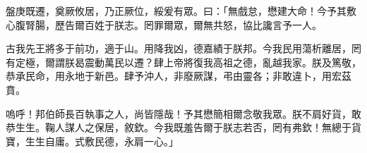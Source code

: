 
\begin{pinyinscope}
盤庚既遷，奠厥攸居，乃正厥位，綏爰有眾。曰：「無戲怠，懋建大命！今予其敷心腹腎腸，歷告爾百姓于朕志。罔罪爾眾，爾無共怒，協比讒言予一人。

古我先王將多于前功，適于山。用降我凶，德嘉績于朕邦。今我民用蕩析離居，罔有定極，爾謂朕曷震動萬民以遷？肆上帝將復我高祖之德，亂越我家。朕及篤敬，恭承民命，用永地于新邑。肆予沖人，非廢厥謀，弔由靈各；非敢違卜，用宏茲賁。

嗚呼！邦伯師長百執事之人，尚皆隱哉！予其懋簡相爾念敬我眾。朕不肩好貨，敢恭生生。鞠人謀人之保居，敘欽。今我既羞告爾于朕志若否，罔有弗欽！無總于貨寶，生生自庸。式敷民德，永肩一心。」


\end{pinyinscope}
